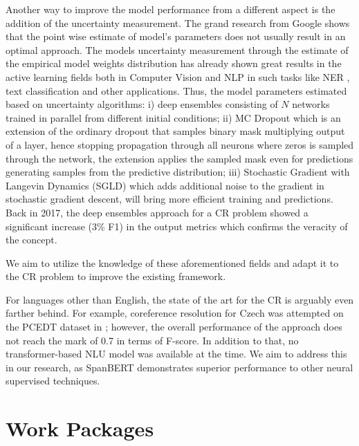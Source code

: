 Another way to improve the model performance from a different aspect is the addition of the uncertainty measurement. 
The grand research from Google \cite{ovadia2019can} shows that the point wise estimate of model’s parameters does not usually result in an optimal approach. The models uncertainty measurement through the estimate of the empirical model weights distribution has already shown great results in the active learning fields both in Computer Vision \cite{gal2017deep} and NLP in such tasks like NER \cite{shen2017deep, lowell2018practical}, text classification \cite{an2018deep} and other applications. 
Thus, the model parameters estimated based on uncertainty algorithms: i) deep ensembles \cite{lakshminarayanan2016simple} consisting of $N$ networks trained in parallel from different initial conditions; ii) MC Dropout \cite{gal2017deep} which is an extension of the ordinary dropout that samples binary mask multiplying output of a layer, hence stopping propagation through all neurons where zeros is sampled through the network, the extension applies the sampled mask even for predictions generating samples from the predictive distribution; iii) Stochastic Gradient with Langevin Dynamics (SGLD) \cite{welling2011bayesian} which adds additional noise to the gradient in stochastic gradient descent, will bring more efficient training and predictions. 
Back in 2017, the deep ensembles approach for a CR problem \cite{cr-Lee17} showed a significant increase (3\% F1) in the output metrics which confirms the veracity of the concept.

We aim to utilize the knowledge of these aforementioned fields and adapt it to the CR problem to improve the existing framework.

{\color{red}
For languages other than English, the state of the art for the CR is arguably even farther behind. 
For example, coreference resolution for Czech was attempted on the PCEDT dataset \cite{pcedt-Hajic2012} in \cite{cr-cz-Novak17}; however, the overall performance of the approach does not reach the mark of 0.7 in terms of F-score. 
In addition to that, no transformer-based NLU model was available at the time. 
We aim to address this in our research, as SpanBERT demonstrates superior performance to other neural supervised techniques.

}

\section{Work Packages}\label{sec:wp}

